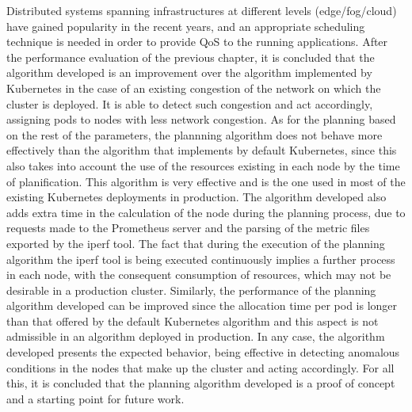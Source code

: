 \documentclass[conference]{IEEEtran}
\begin{document}
Distributed systems spanning infrastructures at different levels (edge/fog/cloud) have gained popularity in the recent years, and an appropriate scheduling technique is needed in order to provide QoS to the running applications. After the performance evaluation of the previous chapter, it is concluded that the algorithm developed is an improvement over the algorithm implemented by Kubernetes in the case 
of an existing congestion of the network on which the cluster is deployed. It is able to detect such congestion and act accordingly, assigning pods to nodes with less network congestion. As for the planning based on the rest of the parameters, the plannning algorithm does not behave more effectively than the algorithm that implements by default Kubernetes, since this also takes into account the use of the resources existing in each node by the time of planification. This algorithm is very effective and is the one used in most of the existing Kubernetes deployments in production. The algorithm developed also adds extra time in the calculation of the node during the planning process, due to requests made to the Prometheus server and the parsing of the metric files exported by the iperf tool. The fact that during the execution of the planning algorithm the iperf tool is being executed continuously implies a further process in each node, with the consequent consumption of resources, which may not be desirable in a production cluster. Similarly, the performance of the planning algorithm developed can be improved since the allocation time per pod is longer than that offered by the default Kubernetes 
algorithm and this aspect is not admissible in an algorithm deployed in production. In any case, the algorithm developed presents the expected behavior, being effective in detecting anomalous conditions in 
the nodes that make up the cluster and acting accordingly. For all this, it is concluded that the planning algorithm developed is a proof of concept and a starting point for future work.
\end{document}
